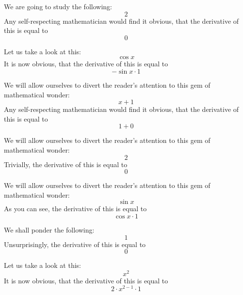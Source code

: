 \documentclass{article}
\begin{document}
We are going to study the following:
\begin{equation}
2 
\end{equation}
Any self-respecting mathematician would find it obvious, that the derivative of this is equal to
\begin{equation}
0 
\end{equation}

Let us take a look at this:
\begin{equation}
\cos x 
\end{equation}
It is now obvious, that the derivative of this is equal to
\begin{equation}
-\sin x \cdot 1 
\end{equation}

We will allow ourselves to divert the reader's attention to this gem of mathematical wonder:
\begin{equation}
x + 1 
\end{equation}
Any self-respecting mathematician would find it obvious, that the derivative of this is equal to
\begin{equation}
1 + 0 
\end{equation}

We will allow ourselves to divert the reader's attention to this gem of mathematical wonder:
\begin{equation}
2 
\end{equation}
Trivially, the derivative of this is equal to
\begin{equation}
0 
\end{equation}

We will allow ourselves to divert the reader's attention to this gem of mathematical wonder:
\begin{equation}
\sin x 
\end{equation}
As you can see, the derivative of this is equal to
\begin{equation}
\cos x \cdot 1 
\end{equation}

We shall ponder the following:
\begin{equation}
1 
\end{equation}
Unsurprisingly, the derivative of this is equal to
\begin{equation}
0 
\end{equation}

Let us take a look at this:
\begin{equation}
x ^{2 } 
\end{equation}
It is now obvious, that the derivative of this is equal to
\begin{equation}
2 \cdot x ^{2 - 1 } \cdot 1 
\end{equation}
\end{document}
